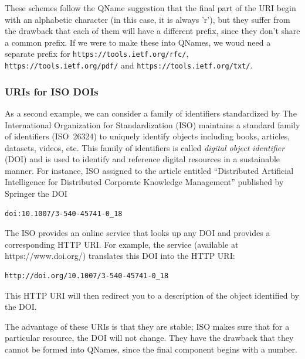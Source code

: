 These schemes follow the QName suggestion that the final part of the URI begin with an alphabetic character (in this case, it is always 'r'), but they suffer from the drawback that each of them will have a different prefix, since they don't share a common prefix.  If we were to make these into QNames, we woud need a separate prefix for \texttt{https://tools.ietf.org/rfc/}, \texttt{https://tools.ietf.org/pdf/} and  \texttt{https://tools.ietf.org/txt/}. 

\subsubsection{URIs for ISO DOIs}


As a second example, we can consider a family of identifiers
standardized by 
The International Organization for Standardization (ISO) maintains a standard family 
of identifiers (ISO~26324) to uniquely identify objects including books, articles, datasets,
videos, etc. This family of identifiers is called \emph{digital object
identifier} (DOI) and is used to identify and reference digital
resources in a sustainable manner. For instance, ISO assigned to the article entitled
``Distributed Artificial Intelligence for Distributed Corporate
Knowledge Management'' published by Springer the DOI

\begin{lstlisting}
doi:10.1007/3-540-45741-0_18
\end{lstlisting}


The ISO  provides an online service that looks up any DOI and provides a corresponding HTTP
URI.   For example, the service (available at https://www.doi.org/) translates this DOI into the HTTP URI:


\begin{lstlisting}
http://doi.org/10.1007/3-540-45741-0_18
\end{lstlisting}


This HTTP URI will then redirect you to a description of the object
identified by the DOI.  

The advantage of these URIs is that they are stable; ISO makes sure that for a particular 
resource, the DOI will not change.  They have the drawback that they cannot be formed into 
QNames, since the final component begins with a number. 






